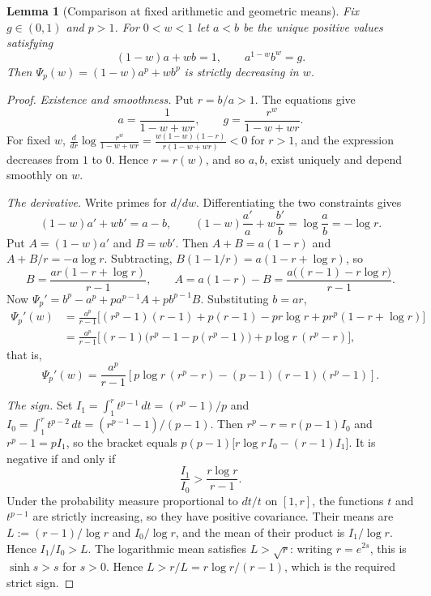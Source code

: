 \documentclass[11pt,a4paper]{article}
\numberwithin{equation}{section}
\newtheorem{lemma}[theorem]{Lemma}
\theoremstyle{definition}
\theoremstyle{remark}
\begin{document}
\begin{lemma}[Comparison at fixed arithmetic and geometric means]\label{lem:weight}
Fix \(g\in(0,1)\) and \(p>1\). For \(0<w<1\) let \(a<b\) be the unique
positive values satisfying
\[
(1-w)a+wb=1,\qquad a^{1-w}b^w=g .
\]
Then \(\Psi_p(w)=(1-w)a^p+wb^p\) is strictly decreasing in \(w\).
\end{lemma}
\begin{proof}
\emph{Existence and smoothness.} Put \(r=b/a>1\). The equations give
\[
a=\frac1{1-w+wr},\qquad g=\frac{r^w}{1-w+wr}.
\]
For fixed \(w\), \(\frac{d}{dr}\log\frac{r^w}{1-w+wr}
=\frac{w(1-w)(1-r)}{r(1-w+wr)}<0\) for \(r>1\), and the expression decreases
from \(1\) to \(0\). Hence \(r=r(w)\), and so \(a,b\), exist uniquely and
depend smoothly on \(w\).

\emph{The derivative.} Write primes for \(d/dw\). Differentiating the two
constraints gives
\[
(1-w)a'+wb'=a-b,\qquad (1-w)\frac{a'}{a}+w\frac{b'}{b}=\log\frac ab=-\log r .
\]
Put \(A=(1-w)a'\) and \(B=wb'\). Then \(A+B=a(1-r)\) and
\(A+B/r=-a\log r\). Subtracting,
\(B(1-1/r)=a(1-r+\log r)\), so
\[
B=\frac{ar(1-r+\log r)}{r-1},\qquad
A=a(1-r)-B=\frac{a\big((r-1)-r\log r\big)}{r-1}.
\]
Now \(\Psi_p'=b^p-a^p+pa^{p-1}A+pb^{p-1}B\). Substituting \(b=ar\),
\begin{align*}
\Psi_p'(w)
&=\frac{a^p}{r-1}\Big[(r^p-1)(r-1)+p(r-1)-pr\log r
 +pr^p(1-r+\log r)\Big]\\
&=\frac{a^p}{r-1}\Big[(r-1)\big(r^p-1-p(r^p-1)\big)+p\log r\,(r^p-r)\Big],
\end{align*}
that is,
\begin{equation}\label{eq:weightderivative}
\Psi_p'(w)=\frac{a^p}{r-1}
\left[p\log r\,(r^p-r)-(p-1)(r-1)(r^p-1)\right].
\end{equation}

\emph{The sign.} Set \(I_1=\int_1^r t^{p-1}\,dt=(r^p-1)/p\) and
\(I_0=\int_1^r t^{p-2}\,dt=(r^{p-1}-1)/(p-1)\). Then
\(r^p-r=r(p-1)I_0\) and \(r^p-1=pI_1\), so the bracket equals
\(p(p-1)\big[r\log r\,I_0-(r-1)I_1\big]\). It is negative if and only if
\[
\frac{I_1}{I_0}>\frac{r\log r}{r-1}.
\]
Under the probability measure proportional to \(dt/t\) on \([1,r]\), the
functions \(t\) and \(t^{p-1}\) are strictly increasing, so they have
positive covariance. Their means are \(L:=(r-1)/\log r\) and
\(I_0/\log r\), and the mean of their product is \(I_1/\log r\). Hence
\(I_1/I_0>L\). The logarithmic mean satisfies \(L>\sqrt r\): writing
\(r=e^{2s}\), this is \(\sinh s>s\) for \(s>0\). Hence \(L>r/L=r\log r/(r-1)\),
which is the required strict sign.
\end{proof}
\end{document}
